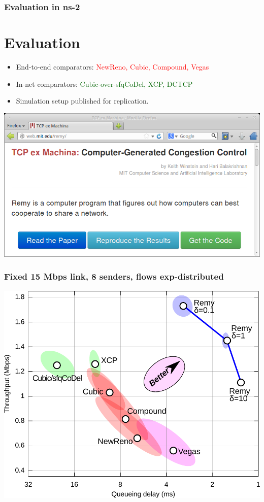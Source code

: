 \documentclass[svgnames]{beamer}
\begin{document}
\begin{frame}
\frametitle{Evaluation in ns-2}

\section{Evaluation}

\begin{itemize}

\item End-to-end comparators: \textcolor{Red}{NewReno, Cubic, Compound, Vegas}

\item In-net comparators: \textcolor{DarkGreen}{Cubic-over-sfqCoDel, XCP, DCTCP}

\item Simulation setup published for replication.

\end{itemize}

\begin{centering}
\includegraphics[width=9 cm]{reproducethis.png}

\end{centering}

\end{frame}

\begin{frame}
\frametitle{Fixed 15 Mbps link, 8 senders, flows exp-distributed}

\noindent \includegraphics[width=8.5 cm]{eth8-final-bytes.pdf}

\end{frame}
\end{document}
